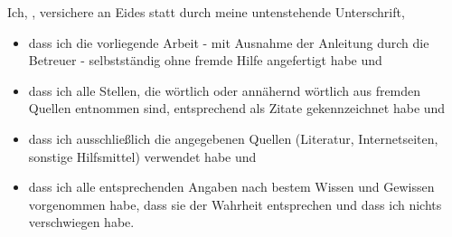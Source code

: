 \documentclass[
11pt, %
oneside, %
english, %
singlespacing, %
parskip, %
headsepline, %
]{MastersDoctoralThesis} %
\begin{document}
\begin{declaration}
\addchaptertocentry{\authorshipname} %

 
 

\noindent Ich, \authorname, versichere an Eides statt durch meine untenstehende Unterschrift,

\begin{itemize} 
\item dass ich die vorliegende Arbeit - mit Ausnahme der Anleitung durch die Betreuer - selbstst\"andig ohne fremde Hilfe angefertigt habe und
\item dass ich alle Stellen, die w\"ortlich oder ann\"ahernd w\"ortlich aus fremden Quellen entnommen sind, entsprechend als Zitate gekennzeichnet habe und
\item dass ich ausschließlich die angegebenen Quellen (Literatur, Internetseiten, sonstige Hilfsmittel) verwendet habe und
\item dass ich alle entsprechenden Angaben nach bestem Wissen und Gewissen vorgenommen habe, dass sie der Wahrheit entsprechen und dass ich nichts verschwiegen habe.
\end{itemize}


\end{declaration}
\end{document}
